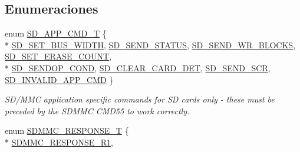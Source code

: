 \subsection*{Enumeraciones}
\begin{DoxyCompactItemize}
\item 
enum \hyperlink{group___c_h_i_p___s_d_m_m_c___definitions_ga1bf27ef97c5e846aa2b0f8372583502a}{S\+D\+\_\+\+A\+P\+P\+\_\+\+C\+M\+D\+\_\+T} \{ \\*
\hyperlink{group___c_h_i_p___s_d_m_m_c___definitions_gga1bf27ef97c5e846aa2b0f8372583502aaaa0038e9c8f98145f38b12340aea391b}{S\+D\+\_\+\+S\+E\+T\+\_\+\+B\+U\+S\+\_\+\+W\+I\+D\+TH}, 
\hyperlink{group___c_h_i_p___s_d_m_m_c___definitions_gga1bf27ef97c5e846aa2b0f8372583502aad822462692847b4e8433157cd75eef70}{S\+D\+\_\+\+S\+E\+N\+D\+\_\+\+S\+T\+A\+T\+US}, 
\hyperlink{group___c_h_i_p___s_d_m_m_c___definitions_gga1bf27ef97c5e846aa2b0f8372583502aa54a07cc39daab1e8f3cfd67b84f2d2ee}{S\+D\+\_\+\+S\+E\+N\+D\+\_\+\+W\+R\+\_\+\+B\+L\+O\+C\+KS}, 
\hyperlink{group___c_h_i_p___s_d_m_m_c___definitions_gga1bf27ef97c5e846aa2b0f8372583502aaa59870a4a4a750b54215771d5407e6a0}{S\+D\+\_\+\+S\+E\+T\+\_\+\+E\+R\+A\+S\+E\+\_\+\+C\+O\+U\+NT}, 
\\*
\hyperlink{group___c_h_i_p___s_d_m_m_c___definitions_gga1bf27ef97c5e846aa2b0f8372583502aa5f7d878965af172c8192cca62aeb7313}{S\+D\+\_\+\+S\+E\+N\+D\+O\+P\+\_\+\+C\+O\+ND}, 
\hyperlink{group___c_h_i_p___s_d_m_m_c___definitions_gga1bf27ef97c5e846aa2b0f8372583502aa04e3e526208c964726f6dc1efa5d19a8}{S\+D\+\_\+\+C\+L\+E\+A\+R\+\_\+\+C\+A\+R\+D\+\_\+\+D\+ET}, 
\hyperlink{group___c_h_i_p___s_d_m_m_c___definitions_gga1bf27ef97c5e846aa2b0f8372583502aa153691d96f3863634920ab18f44df392}{S\+D\+\_\+\+S\+E\+N\+D\+\_\+\+S\+CR}, 
\hyperlink{group___c_h_i_p___s_d_m_m_c___definitions_gga1bf27ef97c5e846aa2b0f8372583502aa63d407edc96d69c1b0cf700c5ba9837e}{S\+D\+\_\+\+I\+N\+V\+A\+L\+I\+D\+\_\+\+A\+P\+P\+\_\+\+C\+MD}
 \}\begin{DoxyCompactList}\small\item\em S\+D/\+M\+MC application specific commands for SD cards only -\/ these must be preceded by the S\+D\+M\+MC C\+M\+D55 to work correctly. \end{DoxyCompactList}
\item 
enum \hyperlink{group___c_h_i_p___s_d_m_m_c___definitions_ga3c7486874b09a91a717cc43d090c4faa}{S\+D\+M\+M\+C\+\_\+\+R\+E\+S\+P\+O\+N\+S\+E\+\_\+T} \{ \\*
\hyperlink{group___c_h_i_p___s_d_m_m_c___definitions_gga3c7486874b09a91a717cc43d090c4faaa2c7ba4101960d1eed6164e90deff2837}{S\+D\+M\+M\+C\+\_\+\+R\+E\+S\+P\+O\+N\+S\+E\+\_\+\+R1}, 

\end{DoxyCompactItemize}
